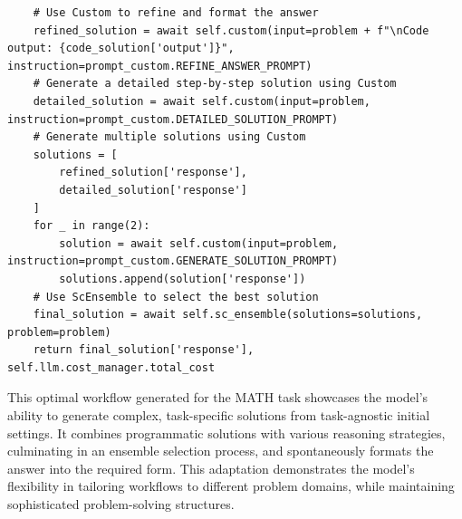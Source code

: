 \documentclass{article} %
\theoremstyle{plain}
\theoremstyle{definition}
\theoremstyle{remark}
\begin{document}
\begin{tcolorbox}
\begin{verbatim}
    # Use Custom to refine and format the answer
    refined_solution = await self.custom(input=problem + f"\nCode output: {code_solution['output']}", instruction=prompt_custom.REFINE_ANSWER_PROMPT)
    # Generate a detailed step-by-step solution using Custom
    detailed_solution = await self.custom(input=problem, instruction=prompt_custom.DETAILED_SOLUTION_PROMPT)
    # Generate multiple solutions using Custom
    solutions = [
        refined_solution['response'],
        detailed_solution['response']
    ]
    for _ in range(2):
        solution = await self.custom(input=problem, instruction=prompt_custom.GENERATE_SOLUTION_PROMPT)
        solutions.append(solution['response'])
    # Use ScEnsemble to select the best solution
    final_solution = await self.sc_ensemble(solutions=solutions, problem=problem)
    return final_solution['response'], self.llm.cost_manager.total_cost
\end{verbatim}
\end{tcolorbox}
This optimal workflow generated for the MATH task showcases the model's ability to generate complex, task-specific solutions from task-agnostic initial settings. It combines programmatic solutions with various reasoning strategies, culminating in an ensemble selection process, and spontaneously formats the answer into the required form. This adaptation demonstrates the model's flexibility in tailoring workflows to different problem domains, while maintaining sophisticated problem-solving structures.
\end{document}
